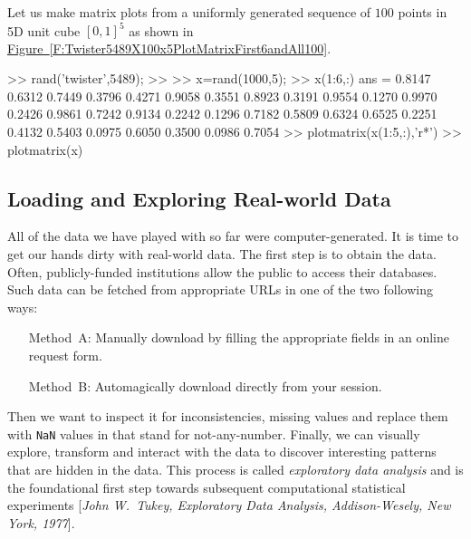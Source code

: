 \begin{labwork}\label{LW:matrixplot5DUniform}
Let us make matrix plots from a uniformly generated  sequence of $100$ points in 5D unit cube $[0,1]^5$ as shown in \hyperref[F:Twister5489X100x5PlotMatrixFirst6andAll100]{Figure~\ref*{F:Twister5489X100x5PlotMatrixFirst6andAll100}}.
\begin{VrbM}
>> rand('twister',5489);
>> %
>> x=rand(1000,5);
>> x(1:6,:) %
ans =
    0.8147    0.6312    0.7449    0.3796    0.4271
    0.9058    0.3551    0.8923    0.3191    0.9554
    0.1270    0.9970    0.2426    0.9861    0.7242
    0.9134    0.2242    0.1296    0.7182    0.5809
    0.6324    0.6525    0.2251    0.4132    0.5403
    0.0975    0.6050    0.3500    0.0986    0.7054
>> plotmatrix(x(1:5,:),'r*') %
>> plotmatrix(x) %
\end{VrbM}
\end{labwork}


\subsection{Loading and Exploring Real-world Data}\label{S:EDA}

All of the data we have played with so far were computer-generated.  It is time to get our hands dirty with real-world data.  The first step is to obtain the data.
Often, publicly-funded institutions allow the public to access their databases.  Such data can be fetched from appropriate URLs in one of the two following ways:
\begin{itemize}
\item[{\sf Method~A}:] Manually download by filling the appropriate fields in an online request form.
\item[{\sf Method~B}:] Automagically download directly from your \Matlab session.
\end{itemize}
Then we want to inspect it for inconsistencies, missing values and replace them with {\tt NaN} values in \Matlab that stand for not-any-number.  Finally, we can visually explore, transform and interact with the data to discover interesting patterns that are hidden in the data.  This process is called {\em exploratory data analysis} and is the foundational first step towards subsequent computational statistical experiments [{\em John W.~Tukey, Exploratory Data Analysis, Addison-Wesely, New York, 1977}].

